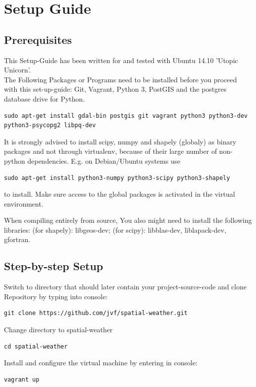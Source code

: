 \documentclass[paper=a4, fontsize=11pt]{article} %
\numberwithin{equation}{section} %
\numberwithin{figure}{section} %
\numberwithin{table}{section} %
\begin{document}
\section{Setup Guide}
\subsection{Prerequisites}

This Setup-Guide has been written for and tested with Ubuntu 14.10 'Utopic Unicorn'.\\
The Following Packages or Programs need to be installed before you proceed with this set-up-guide: Git, Vagrant, Python 3, PostGIS and the postgres database drive for Python.

\begin{lstlisting}
sudo apt-get install gdal-bin postgis git vagrant python3 python3-dev python3-psycopg2 libpq-dev
\end{lstlisting}

It is strongly advised to install scipy, numpy and shapely (globaly) as
binary packages and not through virtualenv, because of their large
number of non-python dependencies. E.g. on Debian/Ubuntu systems use
\begin{lstlisting}
sudo apt-get install python3-numpy python3-scipy python3-shapely
\end{lstlisting}
to install. Make sure access to the global packages is activated in the
virtual environment.

When compiling entirely from source, You also might need to install the
following libraries: (for shapely): libgeos-dev; (for scipy):
libblas-dev, liblapack-dev, gfortran.

\subsection{Step-by-step Setup}
Switch to directory that should later contain your project-source-code and clone Repository by typing into console:
\begin{lstlisting}
git clone https://github.com/jvf/spatial-weather.git
\end{lstlisting}

Change directory to spatial-weather
\begin{lstlisting}
cd spatial-weather
\end{lstlisting}

Install and configure the virtual machine by entering in console:
\begin{lstlisting}
vagrant up
\end{lstlisting}
\end{document}
